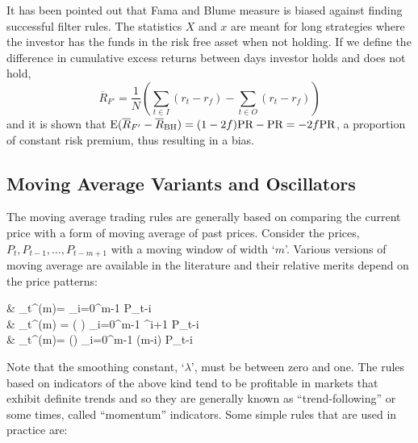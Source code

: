 It has been pointed out that Fama and Blume measure is biased against finding successful filter rules. The statistics $X$ and $x$ are meant for long strategies where the investor has the funds in the risk free asset when not holding. If we define the difference in cumulative excess returns between days investor holds and does not hold,
	\begin{equation} \label{eqn:rfprime}
	\overline{R}_{F'} = \dfrac{1}{N} \left( \sum_{t\in I} (r_t - r_f) - \sum_{t \in O} (r_t - r_f) \right)
	\end{equation}
and it is shown that $\operatorname{E}(\overline{R}_{{F}'} - \overline{R}_{\text{BH}}) = (1 - 2f) \text{PR} - \text{PR} = -2f \text{PR}$, a proportion of constant risk premium, thus resulting in a bias. \label{in:filter2}



\subsection{Moving Average Variants and Oscillators} \label{in:mva1}

The moving average trading rules are generally based on comparing the current price with a form of moving average of past prices. Consider the prices, $P_t, P_{t-1}, \ldots, P_{t-m+1}$ with a moving window of width `$m$'. Various versions of moving average are available in the literature and their relative merits depend on the price patterns:
	\begin{flalign}\label{eqn:multi}
	& _t^{(m)}=  \sum_{i=0}^{m-1} P_{t-i} \notag \\
	& _t^{(m)} = \left( \right) \sum_{i=0}^{m-1} \lambda^{i+1} P_{t-i} \\
	&  _t^{(m)}= \left(\right) \sum_{i=0}^{m-1} (m-i) P_{t-i} \notag
	\end{flalign}
Note that the smoothing constant, `$\lambda$', must be between zero and one. The rules based on indicators of the above kind tend to be profitable in markets that exhibit definite trends and so they are generally known as ``trend-following'' or some times, called ``momentum'' indicators. Some simple rules that are used in practice are: \medbreak


\begin{center}
\noindent{}
\end{center} \twomedskip


